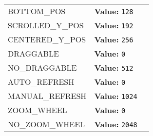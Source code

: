 \begin{longtable}{|p{\varnamewidth}|p{\vardescrwidth}|l}
\raggedright B\-O\-T\-T\-O\-M\-\_\-P\-O\-S\- & \raggedright \textbf{Value:} 
{\tt 128}&\\
\cline{1-2}
\raggedright S\-C\-R\-O\-L\-L\-E\-D\-\_\-Y\-\_\-P\-O\-S\- & \raggedright \textbf{Value:} 
{\tt 192}&\\
\cline{1-2}
\raggedright C\-E\-N\-T\-E\-R\-E\-D\-\_\-Y\-\_\-P\-O\-S\- & \raggedright \textbf{Value:} 
{\tt 256}&\\
\cline{1-2}
\raggedright D\-R\-A\-G\-G\-A\-B\-L\-E\- & \raggedright \textbf{Value:} 
{\tt 0}&\\
\cline{1-2}
\raggedright N\-O\-\_\-D\-R\-A\-G\-G\-A\-B\-L\-E\- & \raggedright \textbf{Value:} 
{\tt 512}&\\
\cline{1-2}
\raggedright A\-U\-T\-O\-\_\-R\-E\-F\-R\-E\-S\-H\- & \raggedright \textbf{Value:} 
{\tt 0}&\\
\cline{1-2}
\raggedright M\-A\-N\-U\-A\-L\-\_\-R\-E\-F\-R\-E\-S\-H\- & \raggedright \textbf{Value:} 
{\tt 1024}&\\
\cline{1-2}
\raggedright Z\-O\-O\-M\-\_\-W\-H\-E\-E\-L\- & \raggedright \textbf{Value:} 
{\tt 0}&\\
\cline{1-2}
\raggedright N\-O\-\_\-Z\-O\-O\-M\-\_\-W\-H\-E\-E\-L\- & \raggedright \textbf{Value:} 
{\tt 2048}&\\
\cline{1-2}
\end{longtable}

